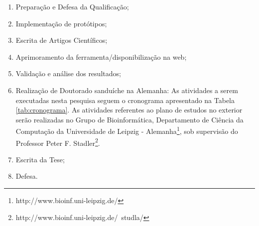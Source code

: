 \begin{enumerate}
\item Preparação e Defesa da Qualificação; 
\item Implementação de protótipos;
\item Escrita de Artigos Científicos;
\item Aprimoramento da ferramenta/disponibilização na web;
\item Validação e análise dos resultados;
\item Realização de Doutorado sanduíche na Alemanha: As atividades a serem executadas nesta pesquisa seguem o cronograma apresentado na Tabela \ref{tab:cronograma}.
As atividades referentes ao plano de estudos no exterior serão realizadas no
Grupo de Bioinformática, Departamento de Ciência da Computação da Universidade de Leipzig - Alemanha\footnote{http://www.bioinf.uni-leipzig.de/}, sob supervisão do Professor Peter F. Stadler\footnote{http://www.bioinf.uni-leipzig.de/~studla/}.
\item Escrita da Tese;
\item Defesa.
\end{enumerate}

